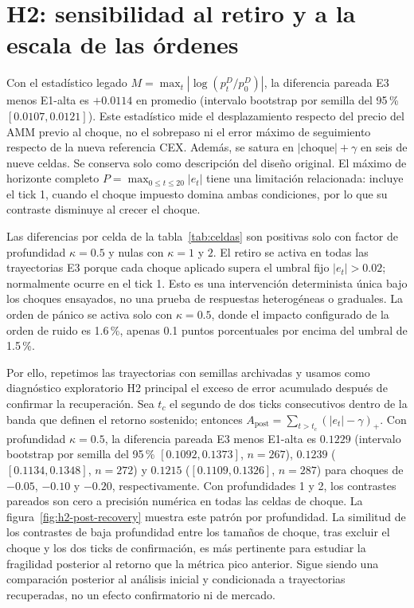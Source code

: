\section{H2: sensibilidad al retiro y a la escala de las órdenes}
\label{sec:res-h2}

Con el estadístico legado $M=\max_t|\log(p_t^D/p_0^D)|$, la diferencia pareada E3 menos E1-alta es $+0.0114$ en promedio (intervalo bootstrap por semilla del 95\,\% $[0.0107,0.0121]$). Este estadístico mide el desplazamiento respecto del precio del AMM previo al choque, no el sobrepaso ni el error máximo de seguimiento respecto de la nueva referencia CEX. Además, se satura en $|\text{choque}|+\gamma$ en seis de nueve celdas. Se conserva solo como descripción del diseño original. El máximo de horizonte completo $P=\max_{0\le t\le20}|e_t|$ tiene una limitación relacionada: incluye el tick 1, cuando el choque impuesto domina ambas condiciones, por lo que su contraste disminuye al crecer el choque.

Las diferencias por celda de la tabla~\ref{tab:celdas} son positivas solo con factor de profundidad $\kappa=0.5$ y nulas con $\kappa=1$ y $2$. El retiro se activa en todas las trayectorias E3 porque cada choque aplicado supera el umbral fijo $|e_t|>0.02$; normalmente ocurre en el tick 1. Esto es una intervención determinista única bajo los choques ensayados, no una prueba de respuestas heterogéneas o graduales. La orden de pánico se activa solo con $\kappa=0.5$, donde el impacto configurado de la orden de ruido es 1.6\,\%, apenas 0.1 puntos porcentuales por encima del umbral de 1.5\,\%.

Por ello, repetimos las trayectorias con semillas archivadas y usamos como diagnóstico exploratorio H2 principal el exceso de error acumulado después de confirmar la recuperación. Sea $t_c$ el segundo de dos ticks consecutivos dentro de la banda que definen el retorno sostenido; entonces $A_{\mathrm{post}}=\sum_{t>t_c}(|e_t|-\gamma)_+$. Con profundidad $\kappa=0.5$, la diferencia pareada E3 menos E1-alta es $0.1229$ (intervalo bootstrap por semilla del 95\,\% $[0.1092,0.1373]$, $n=267$), $0.1239$ ($[0.1134,0.1348]$, $n=272$) y $0.1215$ ($[0.1109,0.1326]$, $n=287$) para choques de $-0.05$, $-0.10$ y $-0.20$, respectivamente. Con profundidades 1 y 2, los contrastes pareados son cero a precisión numérica en todas las celdas de choque. La figura~\ref{fig:h2-post-recovery} muestra este patrón por profundidad. La similitud de los contrastes de baja profundidad entre los tamaños de choque, tras excluir el choque y los dos ticks de confirmación, es más pertinente para estudiar la fragilidad posterior al retorno que la métrica pico anterior. Sigue siendo una comparación posterior al análisis inicial y condicionada a trayectorias recuperadas, no un efecto confirmatorio ni de mercado.

